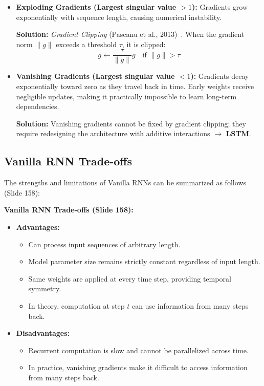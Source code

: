 \begin{itemize}[leftmargin=*]
    \item \textbf{Exploding Gradients (Largest singular value $> 1$):}
    Gradients grow exponentially with sequence length, causing numerical instability.
    
    \textbf{Solution:} \textit{Gradient Clipping} (Pascanu et al., 2013)~\cite{pascanu2013difficulty}. When the gradient norm $\|g\|$ exceeds a threshold $\tau$, it is clipped:
    \[ g \longleftarrow \frac{\tau}{\|g\|} g \quad \text{if } \|g\| > \tau \]
    
    \item \textbf{Vanishing Gradients (Largest singular value $< 1$):}
    Gradients decay exponentially toward zero as they travel back in time. Early weights receive negligible updates, making it practically impossible to learn long-term dependencies.
    
    \textbf{Solution:} Vanishing gradients cannot be fixed by gradient clipping; they require redesigning the architecture with additive interactions $\longrightarrow$ \textbf{LSTM}.
\end{itemize}

\subsection{Vanilla RNN Trade-offs}

The strengths and limitations of Vanilla RNNs can be summarized as follows (Slide 158):

\begin{InsightBox}
\textbf{Vanilla RNN Trade-offs (Slide 158):}
\begin{itemize}[leftmargin=*]
    \item \textbf{Advantages:}
    \begin{itemize}[nosep]
        \item Can process input sequences of arbitrary length.
        \item Model parameter size remains strictly constant regardless of input length.
        \item Same weights are applied at every time step, providing temporal symmetry.
        \item In theory, computation at step $t$ can use information from many steps back.
    \end{itemize}
    \item \textbf{Disadvantages:}
    \begin{itemize}[nosep]
        \item Recurrent computation is slow and cannot be parallelized across time.
        \item In practice, vanishing gradients make it difficult to access information from many steps back.
    \end{itemize}
\end{itemize}
\end{InsightBox}

